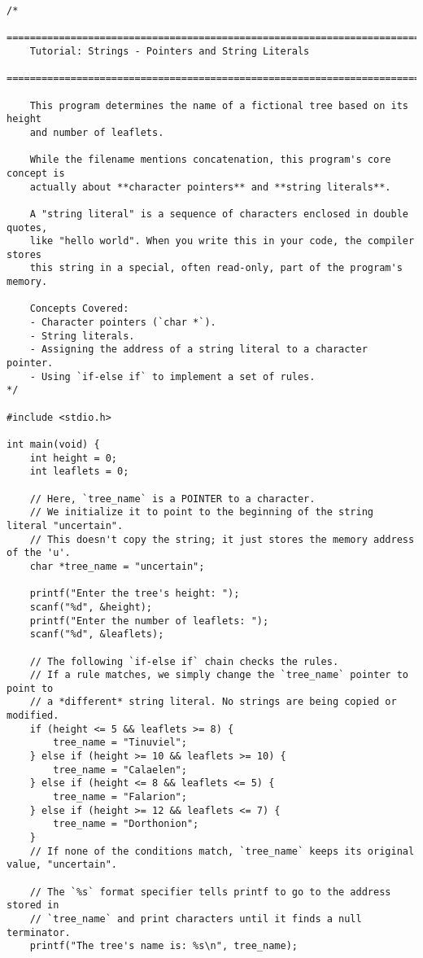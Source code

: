 \documentclass[11pt]{book}
\begin{document}
\begin{verbatim}
/*
    ================================================================================
    Tutorial: Strings - Pointers and String Literals
    ================================================================================

    This program determines the name of a fictional tree based on its height
    and number of leaflets.

    While the filename mentions concatenation, this program's core concept is
    actually about **character pointers** and **string literals**.

    A "string literal" is a sequence of characters enclosed in double quotes,
    like "hello world". When you write this in your code, the compiler stores
    this string in a special, often read-only, part of the program's memory.

    Concepts Covered:
    - Character pointers (`char *`).
    - String literals.
    - Assigning the address of a string literal to a character pointer.
    - Using `if-else if` to implement a set of rules.
*/

#include <stdio.h>

int main(void) {
    int height = 0;
    int leaflets = 0;

    // Here, `tree_name` is a POINTER to a character.
    // We initialize it to point to the beginning of the string literal "uncertain".
    // This doesn't copy the string; it just stores the memory address of the 'u'.
    char *tree_name = "uncertain";

    printf("Enter the tree's height: ");
    scanf("%d", &height);
    printf("Enter the number of leaflets: ");
    scanf("%d", &leaflets);

    // The following `if-else if` chain checks the rules.
    // If a rule matches, we simply change the `tree_name` pointer to point to
    // a *different* string literal. No strings are being copied or modified.
    if (height <= 5 && leaflets >= 8) {
        tree_name = "Tinuviel";
    } else if (height >= 10 && leaflets >= 10) {
        tree_name = "Calaelen";
    } else if (height <= 8 && leaflets <= 5) {
        tree_name = "Falarion";
    } else if (height >= 12 && leaflets <= 7) {
        tree_name = "Dorthonion";
    }
    // If none of the conditions match, `tree_name` keeps its original value, "uncertain".

    // The `%s` format specifier tells printf to go to the address stored in
    // `tree_name` and print characters until it finds a null terminator.
    printf("The tree's name is: %s\n", tree_name);


\end{verbatim}
\end{document}
